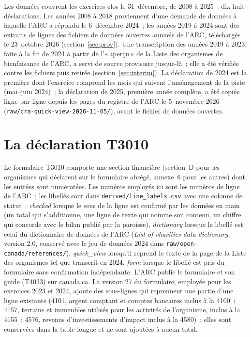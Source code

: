\documentclass[11pt,letterpaper]{article}
\begin{document}
Les données couvrent les exercices clos le 31~décembre, de 2008 à 2025~: dix-huit déclarations. Les années 2008 à 2018 proviennent d'une demande de données à laquelle l'ARC a répondu le 6~décembre 2024~; les années 2019 à 2024 sont des extraits de lignes des fichiers de données ouvertes annuels de l'ARC, téléchargés le 23~octobre 2026 (section~\ref{sec:prov}). Une transcription des années 2019 à 2023, faite à la fin de 2024 à partir de l'«\,aperçu\,» de la Liste des organismes de bienfaisance de l'ARC, a servi de source provisoire jusque-là~; elle a été vérifiée contre les fichiers puis retirée (section~\ref{sec:interim}). La déclaration de 2024 est la première dont l'exercice comprend les mois qui suivent l'aménagement de la piste (mai--juin 2024)~; la déclaration de 2025, première année complète, a été copiée ligne par ligne depuis les pages du registre de l'ARC le 5~novembre 2026 (\texttt{raw/cra-quick-view-2026-11-05/}), avant le fichier de données ouvertes.

\section{La déclaration T3010}

Le formulaire T3010 comporte une section financière (section~D pour les organismes qui déclarent sur le formulaire abrégé, annexe~6 pour les autres) dont les entrées sont numérotées. Les numéros employés ici sont les numéros de ligne de l'ARC~; les libellés sont dans \texttt{derived/line\_labels.csv} avec une colonne de statut~: \emph{checked} lorsque le sens de la ligne est confirmé par les données en main (un total qui s'additionne, une ligne de texte qui nomme son contenu, un chiffre qui concorde avec le bilan publié par la paroisse), \emph{dictionary} lorsque le libellé est celui du dictionnaire de données de l'ARC (\emph{List of charities data dictionary}, version 2.0, conservé avec le jeu de données 2024 dans \texttt{raw/open-canada/references/}), \emph{quick\_view} lorsqu'il reprend le texte de la page de la Liste des organismes tel que transcrit en 2024, \emph{form} lorsque le libellé est pris du formulaire sans confirmation indépendante. L'ARC publie le formulaire et son guide (T4033) sur canada.ca. La version 27 du formulaire, employée pour les exercices 2023 et 2024, ajoute des sous-lignes qui reprennent une partie d'une ligne existante (4101, argent comptant et comptes bancaires inclus à la 4100~; 4157, terrains et immeubles utilisés pour les activités de l'organisme, inclus à la 4155~; 4576, revenus d'investissements d'impact inclus à la 4580)~; elles sont conservées dans la table longue et ne sont ajoutées à aucun total.
\end{document}
